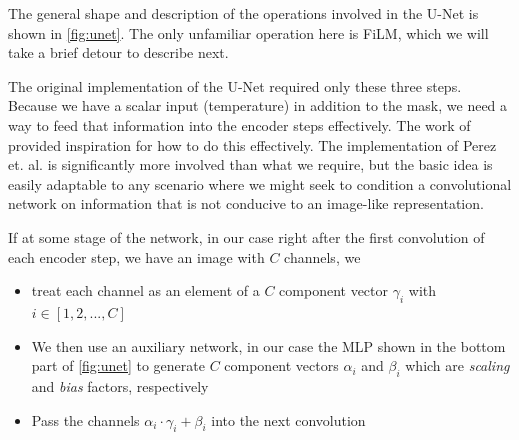 \documentclass[12pt]{article}
\begin{document}
The general shape and description of the operations involved in the U-Net is shown in \ref{fig:unet}. The only unfamiliar operation here
is FiLM, which we will take a brief detour to describe next.

The original implementation of the U-Net required only these three steps. Because we have a scalar input (temperature) in addition to the mask, 
we need a way to feed that information into the encoder steps effectively. The work of \cite{perez2017filmvisualreasoninggeneral} provided inspiration
for how to do this effectively. The implementation of Perez et. al. is significantly more involved than what we require, but the basic idea is easily
adaptable to any scenario where we might seek to condition a convolutional network on information that is not conducive to an image-like representation.

If at some stage of the network, in our case right after the first convolution of each encoder step, we have an image with $C$ channels, we 

\begin{itemize}
	\item treat each channel as an element of a $C$ component vector $\gamma_i$ with $i\in[1,2,...,C]$
	\item We then use an auxiliary network, in our case the MLP shown in the bottom part of \ref{fig:unet}
	to generate $C$ component vectors $\alpha_i$ and $\beta_i$ which are \textit{scaling} and \textit{bias} factors, respectively
	\item Pass the channels $\alpha_i \cdot \gamma_i + \beta_i$ into the next convolution
\end{itemize} 
\end{document}
